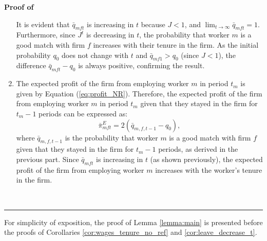 \documentclass[12pt]{article}
\newenvironment{proof}[1][Proof of]{\noindent\textbf{#1} }{\ \rule{0.5em}{0.5em}}
\begin{document}
\begin{proof}
\begin{enumerate}[label={\roman*})]
        It is evident that $\bar{q}_{mft}$ is increasing in $t$ because $J < 1$, and $\lim_{t \rightarrow \infty}\bar{q}_{mft} = 1$. Furthermore, since $J^t$ is decreasing in $t$, the probability that worker $m$ is a good match with firm $f$ increases with their tenure in the firm. As the initial probability $q_0$ does not change with $t$ and $\bar{q}_{mf1} > q_0$ (since $J < 1$), the difference $\bar{q}_{mft} - q_0$ is always positive, confirming the result.
        \item The expected profit of the firm from employing worker $m$ in period $t_m$ is given by Equation (\ref{eq:profit_NR}). Therefore, the expected profit of the firm from employing worker $m$ in period $t_m$ given that they stayed in the firm for $t_m-1$ periods can be expressed as:
        \begin{equation*}
            \bar{\pi}^E_{mft} = 2(\bar{q}_{m,f,t-1} - q_0),
        \end{equation*}
        where $\bar{q}_{m,f,t-1}$ is the probability that worker $m$ is a good match with firm $f$ given that they stayed in the firm for $t_m-1$ periods, as derived in the previous part. Since $\bar{q}_{mft}$ is increasing in $t$ (as shown previously), the expected profit of the firm from employing worker $m$ increases with the worker's tenure in the firm.
    \end{enumerate}
\end{proof}







For simplicity of exposition, the proof of Lemma \ref{lemma:main} is presented before the proofs of Corollaries \ref{cor:wages_tenure_no_ref} and \ref{cor:leave_decrease_t}.
\end{document}
